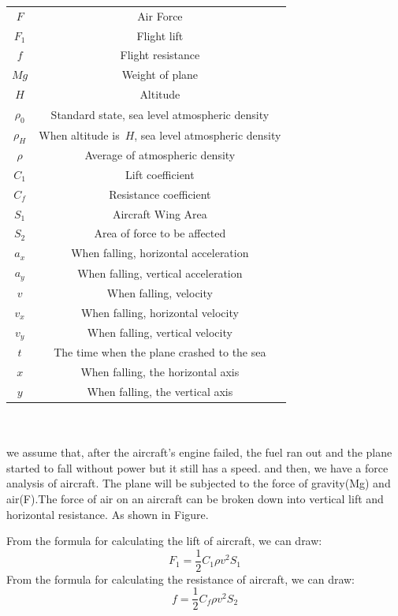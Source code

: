 \documentclass[11pt]{article}
\begin{document}
\begin{tabular}{cc}
$F$&Air Force\\
$F_1$&Flight lift\\
$f$&Flight resistance\\
$Mg$& Weight of plane\\
$H$& Altitude\\
$\rho_0$& Standard state, sea level atmospheric density\\
$\rho_H$& When altitude is\ $ H$, sea level atmospheric density\\
$\rho$& Average of atmospheric density\\
$C_1$& Lift coefficient\\
$C_f$& Resistance coefficient\\
$S_1$& Aircraft Wing Area\\
$S_2$& Area of force to be affected\\
$a_x$&When falling, horizontal acceleration\\
$a_y$&When falling, vertical acceleration\\
$v$&When falling, velocity\\
$v_x$&When falling, horizontal velocity\\
$v_y$&When falling, vertical velocity\\
$t$&The time when the plane crashed to the sea\\
$x$&When falling, the horizontal axis\\
$y$&When falling, the vertical axis\\
\end{tabular}
\\\\
we assume that, after the aircraft's engine failed, the fuel ran out and the plane started to fall without power but it still has a speed. and then, we have a force analysis of aircraft. The plane will be subjected to the force of gravity(Mg) and air(F).The force of air on an aircraft can be broken down into vertical lift and horizontal resistance.\cite{焦晓君2015一种落水失联飞机的搜寻方案} As shown in Figure.\\
\begin{center}
    \end{center}
From the formula for calculating the lift of aircraft, we can draw:\\
\[F_1=\frac{1}{2}C_1\rho v^2 S_1\] 
From the formula for calculating the resistance of aircraft, we can draw:\\
\[f=\frac{1}{2}C_f\rho v^2 S_2\] 
\end{document}
